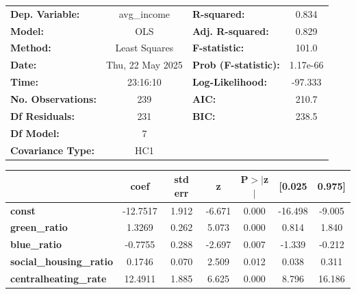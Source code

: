 \begin{center}
\begin{tabular}{lclc}
\toprule
\textbf{Dep. Variable:}           &   avg\_income    & \textbf{  R-squared:         } &     0.834   \\
\textbf{Model:}                   &       OLS        & \textbf{  Adj. R-squared:    } &     0.829   \\
\textbf{Method:}                  &  Least Squares   & \textbf{  F-statistic:       } &     101.0   \\
\textbf{Date:}                    & Thu, 22 May 2025 & \textbf{  Prob (F-statistic):} &  1.17e-66   \\
\textbf{Time:}                    &     23:16:10     & \textbf{  Log-Likelihood:    } &   -97.333   \\
\textbf{No. Observations:}        &         239      & \textbf{  AIC:               } &     210.7   \\
\textbf{Df Residuals:}            &         231      & \textbf{  BIC:               } &     238.5   \\
\textbf{Df Model:}                &           7      & \textbf{                     } &             \\
\textbf{Covariance Type:}         &       HC1        & \textbf{                     } &             \\
\bottomrule
\end{tabular}
\begin{tabular}{lcccccc}
                                  & \textbf{coef} & \textbf{std err} & \textbf{z} & \textbf{P$> |$z$|$} & \textbf{[0.025} & \textbf{0.975]}  \\
\midrule
\textbf{const}                    &     -12.7517  &        1.912     &    -6.671  &         0.000        &      -16.498    &       -9.005     \\
\textbf{green\_ratio}             &       1.3269  &        0.262     &     5.073  &         0.000        &        0.814    &        1.840     \\
\textbf{blue\_ratio}              &      -0.7755  &        0.288     &    -2.697  &         0.007        &       -1.339    &       -0.212     \\
\textbf{social\_housing\_ratio}   &       0.1746  &        0.070     &     2.509  &         0.012        &        0.038    &        0.311     \\
\textbf{centralheating\_rate}     &      12.4911  &        1.885     &     6.625  &         0.000        &        8.796    &       16.186     \\

\end{tabular}
\end{center}
